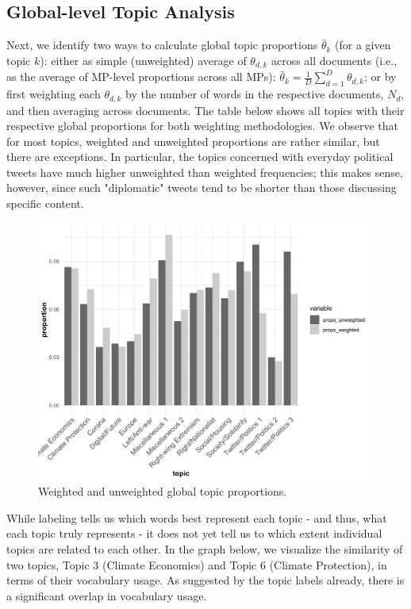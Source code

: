 \subsection{Global-level Topic Analysis}

Next, we identify two ways to calculate global topic proportions $\bar{\theta}_k$ (for a given topic $k$): either as simple (unweighted) average of $\theta_{d,k}$ across all documents (i.e., as the average of MP-level proportions across all MPs): $\bar{\theta}_k = \frac{1}{D}\sum_{d=1}^{D}\theta_{d,k}$; or by first weighting each $\theta_{d,k}$ by the number of words in the respective documents, $N_d$, and then averaging across documents. The table below shows all topics with their respective global proportions for both weighting methodologies. We observe that for most topics, weighted and unweighted proportions are rather similar, but there are exceptions. In particular, the topics concerned with everyday political tweets have much higher unweighted than weighted frequencies; this makes sense, however, since such "diplomatic" tweets tend to be shorter than those discussing specific content.

\begin{figure}[h!]
  \centering
  \captionsetup{justification=centering,margin=2cm}
  \includegraphics[scale = 0.5]{../plots/4_3/global_thetas.pdf}
  \caption{Weighted and unweighted global topic proportions.}
  \label{fig:global_thetas}
\end{figure}

While labeling tells us which words best represent each topic - and thus, what each topic truly represents - it does not yet tell us to which extent individual topics are related to each other. In the graph below, we visualize the similarity of two topics, Topic 3 (Climate Economics) and Topic 6 (Climate Protection), in terms of their vocabulary usage. As suggested by the topic labels already, there is a significant overlap in vocabulary usage.

